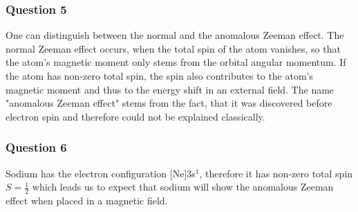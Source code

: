 \subsubsection{Question 5}
One can distinguish between the normal and the anomalous Zeeman effect. 
The normal Zeeman effect occurs, when the total spin of the atom vanishes, so that the atom's magnetic moment only stems from the orbital angular momentum. If the atom has non-zero total spin, the spin also contributes to the atom's magnetic moment and thus to the energy shift in an external field. The name "anomalous Zeeman effect" stems from the fact, that it was discovered before electron spin and therefore could not be explained classically. 
\subsubsection{Question 6}
Sodium has the electron configuration [Ne]$3$s$^1$, therefore  it has non-zero total spin $S=\frac{1}{2}$ which leads us to expect that sodium will show the anomalous Zeeman effect when placed in a magnetic field. 
